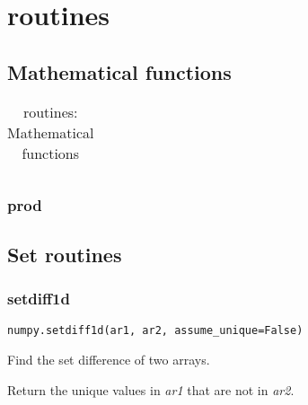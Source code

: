 \chapter{routines\label{routines}}
\section{Mathematical functions}
\begin{table}
    \centering
    \caption{routines: Mathematical functions}
    \begin{tabular}{ll}
        \hline
        \nameref{prod} & \nameref{setdiff1d} \\
        \hline
    \end{tabular}
\end{table}
\subsection{prod\label{prod}}
\section{Set routines}
\subsection{setdiff1d\label{setdiff1d}}
\verb|numpy.setdiff1d(ar1, ar2, assume_unique=False)|

Find the set difference of two arrays.

Return the unique values in \textit{ar1} that are not in \textit{ar2}.